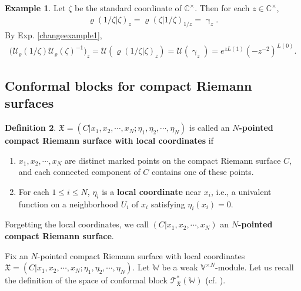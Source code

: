 \documentclass[11pt,b5paper,notitlepage]{article}
\theoremstyle{definition}
\newtheorem{df}{Definition}[subsection]
\newtheorem{eg}[df]{Example}
\theoremstyle{plain}
\newcommand{\Vbb}{\mathbb V}
\newcommand{\Wbb}{\mathbb W}
\newcommand{\Cbb}{\mathbb C}
\newcommand{\<}{\left\langle}
\renewcommand{\>}{\right\rangle}
\newcommand{\MU}{\mathcal{U}}
\newcommand{\fx}{\mathfrak{X}}
\newcommand{\ST}{\mathscr{T}}
\numberwithin{equation}{subsection}
\begin{document}
\begin{eg}\label{lb60}
    Let $\zeta$ be the standard coordinate of $\Cbb^\times$. Then for each $z\in \Cbb^\times$, 
    \begin{align*}
        \varrho(1/\zeta\vert \zeta)_z=\varrho(\zeta\vert 1/\zeta)_{1/z}=\upgamma_z.
    \end{align*}
    By Exp. \ref{changeexample1}, 
    \begin{align*}
       \big( \MU_\varrho(1/\zeta)\MU_\varrho(\zeta)^{-1}\big)_z=\MU(\varrho(1/\zeta\vert \zeta)_z)=\MU(\upgamma_z)=e^{z L(1)}(-z^{-2})^{L(0)}.
    \end{align*}
\end{eg}
\subsection{Conformal blocks for compact Riemann surfaces}
\begin{df}
$\fx=(C\big| x_1,x_2,\cdots,x_N;\eta_1,\eta_2,\cdots,\eta_N)$ is called an \textbf{$N$-pointed compact Riemann surface with local coordinates} if 
\begin{enumerate}[label=(\arabic*)]
    \item $x_1,x_2,\cdots,x_N$ are distinct marked points on the compact Riemann surface $C$, and each connected component of $C$ contains one of these points.
    \item For each $1\leq i\leq N$, $\eta_i$ is a \textbf{local coordinate}  near $x_i$, i.e., a univalent function on a neighborhood $U_i$ of $x_i$ satisfying $\eta_i(x_i)=0$.
\end{enumerate}
Forgetting the local coordinates, we call $(C\big| x_1,x_2,\cdots,x_N)$ an \textbf{$N$-pointed compact Riemann surface}.
\end{df}
Fix an $N$-pointed compact Riemann surface with local coordinates $\fx=(C\big| x_1,x_2,\cdots,x_N;\eta_1,\eta_2,\cdots,\eta_N)$. Let $\Wbb$ be a weak $\Vbb^{\times N}$-module. Let us recall the definition of the space of conformal block $\ST_\fx^*(\Wbb)$ (cf. \cite[Ch. 9]{FB04}).
\end{document}
